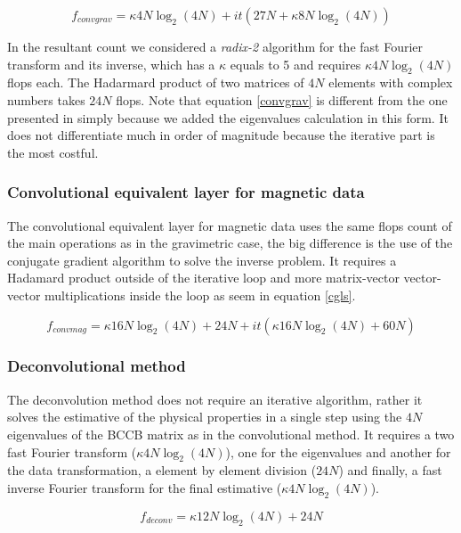 \begin{equation}
	f_{convgrav} = \kappa4N\log_2(4N) + it(27N + \kappa8N\log_2(4N))
\label{convgrav}
\end{equation}

In the resultant count we considered a \textit{radix-2} algorithm for the fast Fourier transform and its inverse, which has a $\kappa$ equals to 5 and requires $\kappa4N\log_2(4N)$ flops each. The Hadarmard product of two matrices of $4N$ elements with complex numbers takes $24N$ flops. Note that equation \ref{convgrav} is different from the one presented in \cite{takahashi2020convolutional} simply because we added the eigenvalues calculation in this form. It does not differentiate much in order of magnitude because the iterative part is the most costful.

\subsubsection{Convolutional equivalent layer for magnetic data \citep{takahashi2022}}

The convolutional equivalent layer for magnetic data uses the same flops count of the main operations as in the gravimetric case, the big difference is the use of the conjugate gradient algorithm to solve the inverse problem.
It requires a Hadamard product outside of the iterative loop and more matrix-vector vector-vector multiplications inside the loop as seem in equation \ref{cgls}.

\begin{equation}
	f_{convmag} = \kappa16N\log_2(4N) + 24N + it(\kappa16N\log_2(4N) + 60N)
\label{convmag}
\end{equation}

\subsubsection{Deconvolutional method}

The deconvolution method does not require an iterative algorithm, rather it solves the estimative of the physical properties in a single step using the $4N$ eigenvalues of the BCCB matrix as in the convolutional method. It requires a two fast Fourier transform ($\kappa4N\log_2(4N)$), one for the eigenvalues and another for the data transformation, a element by element division ($24N$) and finally, a fast inverse Fourier transform for the final estimative ($\kappa4N\log_2(4N)$).

\begin{equation}
	f_{deconv} = \kappa12N\log_2(4N) + 24N
	\label{deconv}
\end{equation}

